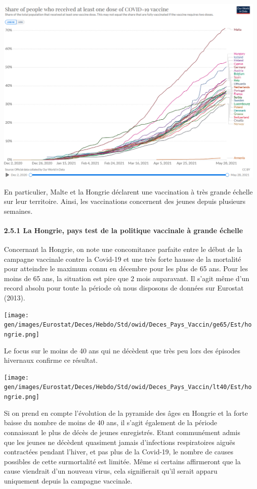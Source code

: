 \documentclass[
]{article}
\begin{document}
\includegraphics[width=10.41667in,height=\textheight]{data/images/ourworldindata.png}

En particulier, Malte et la Hongrie déclarent une vaccination à très
grande échelle sur leur territoire. Ainsi, les vaccinations concernent
des jeunes depuis plusieurs semaines.

\hypertarget{la-hongrie-pays-test-de-la-politique-vaccinale-uxe0-grande-uxe9chelle}{%
\paragraph{2.5.1 La Hongrie, pays test de la politique vaccinale à
grande
échelle}\label{la-hongrie-pays-test-de-la-politique-vaccinale-uxe0-grande-uxe9chelle}}

Concernant la Hongrie, on note une concomitance parfaite entre le début
de la campagne vaccinale contre la Covid-19 et une très forte hausse de
la mortalité pour atteindre le maximum connu en décembre pour les plus
de 65 ans. Pour les moins de 65 ans, la situation est pire que 2 mois
auparavant. Il s'agit même d'un record absolu pour toute la période où
nous disposons de données sur Eurostat (2013).

\texttt{[image: gen/images/Eurostat/Deces/Hebdo/Std/owid/Deces\_Pays\_Vaccin/ge65/Est/hongrie.png]}

Le focus sur le moins de 40 ans qui ne décèdent que très peu lors des
épisodes hivernaux confirme ce résultat.

\texttt{[image: gen/images/Eurostat/Deces/Hebdo/Std/owid/Deces\_Pays\_Vaccin/lt40/Est/hongrie.png]}

Si on prend en compte l'évolution de la pyramide des âges en Hongrie et
la forte baisse du nombre de moins de 40 ans, il s'agit également de la
période connaissant le plus de décès de jeunes enregistrés. Etant
communément admis que les jeunes ne décèdent quasiment jamais
d'infections respiratoires aiguës contractées pendant l'hiver, et pas
plus de la Covid-19, le nombre de causes possibles de cette surmortalité
est limitée. Même si certains affirmeront que la cause viendrait d'un
nouveau virus, cela signifierait qu'il serait apparu uniquement depuis
la campagne vaccinale.
\end{document}
